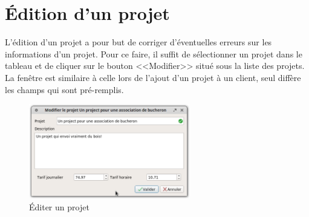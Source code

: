 \section{Édition d'un projet}
L’édition d’un projet a pour but de corriger d’éventuelles erreurs sur les informations d’un projet. Pour ce faire, il suffit de sélectionner un projet dans le tableau et de cliquer sur le bouton <<Modifier>> situé sous la liste des projets. 
La fenêtre est similaire à celle lors de l'ajout d'un projet à un client, seul diffère les champs qui sont pré-remplis. 
\begin{figure}[H]
	\centering
	\includegraphics[width=7cm]{screens/editerProjet.png}
	\caption{Éditer un projet}
\end{figure}